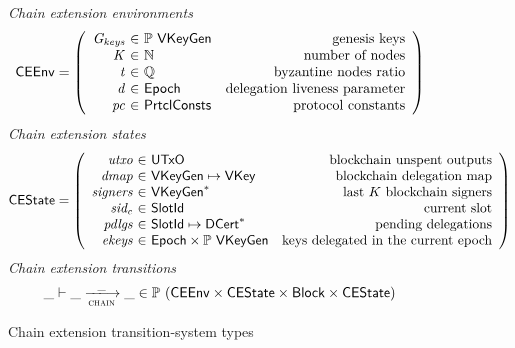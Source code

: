 \begin{figure}
  \emph{Chain extension environments}
  \begin{equation*}
    \CEEnv =
    \left(
      \begin{array}{r@{~\in~}lr}
        \var{\Gkeys} & \powerset{\VKeyGen} & \text{genesis keys}\\
        \var{K} & \mathbb{N} & \text{number of nodes}\\
        \var{t} & \mathbb{Q} & \text{byzantine nodes ratio}\\
        \var{d} & \Epoch & \text{delegation liveness parameter}\\
        \var{pc} & \PrtclConsts & \text{protocol constants}\\
      \end{array}
    \right)
  \end{equation*}
  \emph{Chain extension states}
  \begin{equation*}
    \CEState =
    \left(
      \begin{array}{r@{~\in~}lr}
        \var{utxo} & \UTxO & \text{blockchain unspent outputs}\\
        \var{dmap} & \VKeyGen \mapsto \VKey & \text{blockchain delegation map}\\
        \var{signers} & \seqof{\VKeyGen} & \text{last $K$ blockchain signers}\\
        \var{sid_c} & \SlotId & \text{current slot}\\
        \var{pdlgs} & \SlotId \mapsto \seqof{\DCert} & \text{pending delegations}\\
        \var{ekeys} & \Epoch \times \powerset{\VKeyGen} & \text{keys delegated in the current epoch}
      \end{array}
    \right)
  \end{equation*}
  \emph{Chain extension transitions}
  \begin{equation*}
    \_ \vdash \_ \trans{chain}{\_} \_ \in
      \powerset (\CEEnv \times \CEState \times \Block \times \CEState)
  \end{equation*}
  \caption{Chain extension transition-system types}
  \label{fig:ts-types:chain-extension}
\end{figure}

